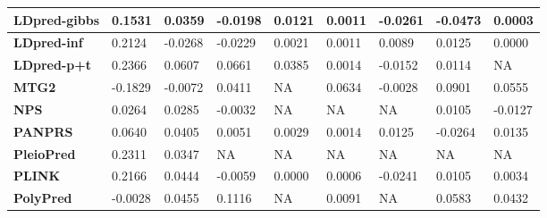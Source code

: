 \documentclass[pdflatex,sn-basic]{sn-jnl}
\begin{document}
\begin{table}[!ht]
{\begin{tabular}{|l|l|l|l|l|l|l|l|l|}
\hline
\textbf{LDpred-gibbs} & \cellcolor[HTML]{C4DA81}0.1531 & \cellcolor[HTML]{E4E483}0.0359 & \cellcolor[HTML]{F98D72}-0.0198 & \cellcolor[HTML]{C1D981}0.0121 & \cellcolor[HTML]{FEE883}0.0011 & \cellcolor[HTML]{FEE783}-0.0261 & \cellcolor[HTML]{F8766D}-0.0473 & \cellcolor[HTML]{FFEB84}0.0003 \\
\hline
\textbf{LDpred-inf} & \cellcolor[HTML]{95CD7E}0.2124 & \cellcolor[HTML]{F8696B}-0.0268 & \cellcolor[HTML]{F98770}-0.0229 & \cellcolor[HTML]{E4E483}0.0021 & \cellcolor[HTML]{FEE883}0.0011 & \cellcolor[HTML]{ACD380}0.0089 & \cellcolor[HTML]{F7E984}0.0125 & \cellcolor[HTML]{FEE983}0.0000 \\
\hline
\textbf{LDpred-p+t} & \cellcolor[HTML]{81C77D}0.2366 & \cellcolor[HTML]{63BE7B}0.0607 & \cellcolor[HTML]{B9D780}0.0661 & \cellcolor[HTML]{63BE7B}0.0385 & \cellcolor[HTML]{FEE883}0.0014 & \cellcolor[HTML]{E8E583}-0.0152 & \cellcolor[HTML]{F9EA84}0.0114 & NA\\
\hline
\textbf{MTG2} & \cellcolor[HTML]{F98670}-0.1829 & \cellcolor[HTML]{FA9573}-0.0072 & \cellcolor[HTML]{E8E583}0.0411 & NA& \cellcolor[HTML]{81C77D}0.0634 & \cellcolor[HTML]{C9DC81}-0.0028 & \cellcolor[HTML]{64BF7C}0.0901 & \cellcolor[HTML]{73C37C}0.0555 \\
\hline
\textbf{NPS} & \cellcolor[HTML]{FDD680}0.0264 & \cellcolor[HTML]{FEE683}0.0285 & \cellcolor[HTML]{FBAD78}-0.0032 & NA& NA& NA& \cellcolor[HTML]{FBEA84}0.0105 & \cellcolor[HTML]{FA9673}-0.0127 \\
\hline
\textbf{PANPRS} & \cellcolor[HTML]{FEE582}0.0640 & \cellcolor[HTML]{CCDD82}0.0405 & \cellcolor[HTML]{FCBD7B}0.0051 & \cellcolor[HTML]{E1E383}0.0029 & \cellcolor[HTML]{FEE883}0.0014 & \cellcolor[HTML]{A3D17F}0.0125 & \cellcolor[HTML]{FBA276}-0.0264 & \cellcolor[HTML]{DEE283}0.0135 \\
\hline
\textbf{PleioPred} & \cellcolor[HTML]{86C87D}0.2311 & \cellcolor[HTML]{EAE583}0.0347 & NA& NA& NA& NA& NA& NA\\
\hline
\textbf{PLINK} & \cellcolor[HTML]{91CC7E}0.2166 & \cellcolor[HTML]{B8D780}0.0444 & \cellcolor[HTML]{FBA877}-0.0059 & \cellcolor[HTML]{ECE683}0.0000 & \cellcolor[HTML]{FEE883}0.0006 & \cellcolor[HTML]{FEEB84}-0.0241 & \cellcolor[HTML]{FBEA84}0.0105 & \cellcolor[HTML]{F7E984}0.0034 \\
\hline
\textbf{PolyPred} & \cellcolor[HTML]{FDCB7D}-0.0028 & \cellcolor[HTML]{B2D580}0.0455 & \cellcolor[HTML]{63BE7B}0.1116 & NA& \cellcolor[HTML]{F9EA84}0.0091 & NA& \cellcolor[HTML]{A0D07F}0.0583 & \cellcolor[HTML]{92CC7E}0.0432 \\

\end{tabular}}
\end{table}
\end{document}
